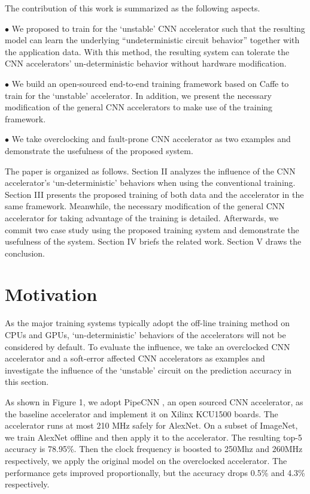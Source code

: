   The contribution of this work is summarized as the following aspects. 

$\bullet$ We proposed to train for the ‘unstable’ CNN accelerator 
such that the resulting model can learn the underlying “undeterministic 
circuit behavior” together with the application data. 
With this method, the resulting system can tolerate the CNN accelerators’ un-deterministic 
behavior without hardware modification. 

$\bullet$ We build an open-sourced end-to-end training framework 
based on Caffe to train for the ‘unstable’ accelerator. In addition, 
we present the necessary modification of the general 
CNN accelerators to make use of the training framework.

$\bullet$ We take overclocking and fault-prone CNN accelerator 
as two examples and demonstrate the usefulness of the proposed system.

  The paper is organized as follows. Section II analyzes the influence of 
the CNN accelerator’s ‘un-deterministic’ behaviors when using the conventional 
training. Section III presents the proposed training of both data and the 
accelerator in the same framework. Meanwhile, the necessary modification of 
the general CNN accelerator for taking advantage of the training is detailed. 
Afterwards, we commit two case study using the proposed training system and 
demonstrate the usefulness of the system. Section IV briefs the related work. 
Section V draws the conclusion. 

\section{Motivation} \label{sec:motivation}
  As the major training systems typically adopt the off-line training method 
on CPUs and GPUs, ‘un-deterministic’ behaviors of the accelerators will not 
be considered by default. To evaluate the influence, we take an overclocked 
CNN accelerator and a soft-error affected CNN accelerators as examples and 
investigate the influence of the ‘unstable’ circuit on the prediction accuracy in this section.

  As shown in Figure 1, we adopt PipeCNN\cite{pipecnn_2} , an open sourced CNN accelerator, 
as the baseline accelerator and implement it on Xilinx KCU1500 boards. The accelerator 
runs at most 210 MHz safely for AlexNet. On a subset of ImageNet, we train AlexNet offline 
and then apply it to the accelerator. The resulting top-5 accuracy is 78.95\%. Then the clock 
frequency is boosted to 250Mhz and 260MHz respectively, we apply the original model on 
the overclocked accelerator. The performance gets improved proportionally, but the 
accuracy drops 0.5\% and 4.3\% respectively.

